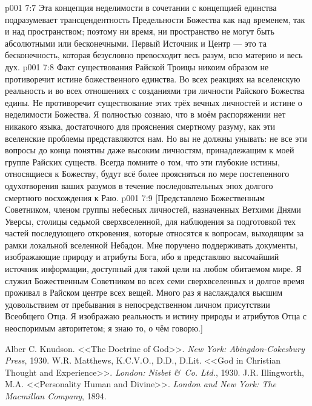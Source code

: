 \vs p001 7:7 Эта концепция неделимости в сочетании с концепцией единства подразумевает трансцендентность Предельности Божества как над временем, так и над пространством; поэтому ни время, ни пространство не могут быть абсолютными или бесконечными. Первый Источник и Центр --- это та бесконечность, которая безусловно превосходит весь разум, всю материю и весь дух.
\vs p001 7:8 Факт существования Райской Троицы никоим образом не противоречит истине божественного единства. Во всех реакциях на вселенскую реальность и во всех отношениях с созданиями три личности Райского Божества едины. Не противоречит существование этих трёх вечных личностей и истине о неделимости Божества. Я полностью сознаю, что в моём распоряжении нет никакого языка, достаточного для прояснения смертному разуму, как эти вселенские проблемы представляются нам. Но вы не должны унывать: не все эти вопросы до конца понятны даже высоким личностям, принадлежащим к моей группе Райских существ. Всегда помните о том, что эти глубокие истины, относящиеся к Божеству, будут всё более проясняться по мере постепенного одухотворения ваших разумов в течение последовательных эпох долгого смертного восхождения к Раю.
\vsetoff
\vs p001 7:9 [Представлено Божественным Советником, членом группы небесных личностей, назначенных Ветхими Днями Уверсы, столицы седьмой сверхвселенной, для наблюдения за подготовкой тех частей последующего откровения, которые относятся к вопросам, выходящим за рамки локальной вселенной Небадон. Мне поручено поддерживать документы, изображающие природу и атрибуты Бога, ибо я представляю высочайший источник информации, доступный для такой цели на любом обитаемом мире. Я служил Божественным Советником во всех семи сверхвселенных и долгое время проживал в Райском центре всех вещей. Много раз я наслаждался высшим удовольствием от пребывания в непосредственном личном присутствии Всеобщего Отца. Я изображаю реальность и истину природы и атрибутов Отца с неоспоримым авторитетом; я знаю то, о чём говорю.]
\quizlink
\begin{thebibliography}{100}
Alber C. Knudson.
{<<The Doctrine of God>>.}
{\em New York: Abingdon-Cokesbury Press}, 1930.
W.R. Matthews, K.C.V.O., D.D., D.Lit.
{<<God in Christian Thought and Experience>>.}
{\em London: Nisbet \&\ Co. Ltd.}, 1930.
J.R. Illingworth, M.A.
{<<Personality Human and Divine>>.}
{\em London and New York: The Macmillan Company}, 1894.
\end{thebibliography}
